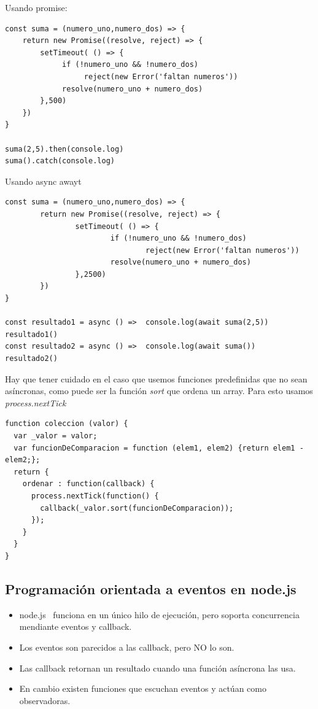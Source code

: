 \documentclass[4paper]{article}
\newcommand{\N}{node.js}
\begin{document}
Usando promise:
\begin{lstlisting}
const suma = (numero_uno,numero_dos) => {
    return new Promise((resolve, reject) => {
        setTimeout( () => {
             if (!numero_uno && !numero_dos)
                  reject(new Error('faltan numeros'))
             resolve(numero_uno + numero_dos)
        },500)
    })
}

suma(2,5).then(console.log)
suma().catch(console.log)
\end{lstlisting}

\newpage

Usando async awayt
\begin{lstlisting}
const suma = (numero_uno,numero_dos) => {
        return new Promise((resolve, reject) => {
                setTimeout( () => {
                        if (!numero_uno && !numero_dos)
                                reject(new Error('faltan numeros'))
                        resolve(numero_uno + numero_dos)
                },2500)
        })
}

const resultado1 = async () =>  console.log(await suma(2,5))
resultado1()
const resultado2 = async () =>  console.log(await suma())
resultado2()
\end{lstlisting}

Hay que tener cuidado en el caso que usemos funciones predefinidas que no sean asíncronas, como puede ser la función \emph{sort} que ordena un array. Para esto usamos \emph{process.nextTick}
\begin{lstlisting}
function coleccion (valor) {
  var _valor = valor;
  var funcionDeComparacion = function (elem1, elem2) {return elem1 -elem2;};
  return {
    ordenar : function(callback) {
      process.nextTick(function() {
        callback(_valor.sort(funcionDeComparacion));
      });
    }
  }
}
\end{lstlisting}

\newpage
\subsection{Programación orientada a eventos en \N}
\begin{itemize}
\item \N ~ funciona en un único hilo de ejecución, pero soporta concurrencia mendiante eventos y callback.
\item Los eventos son parecidos a las callback, pero NO lo son.
\item Las callback retornan un resultado cuando una función asíncrona las usa.
\item En cambio existen funciones que escuchan eventos y actúan como observadoras.
\end{itemize}
\end{document}
